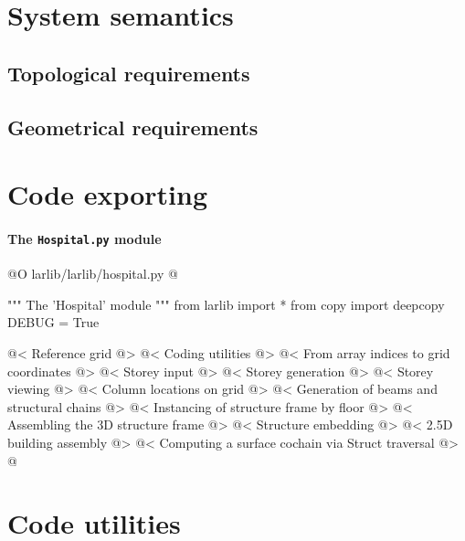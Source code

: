 \documentclass[11pt,oneside]{article}    %
\begin{document}
\section{System semantics}

\subsection{Topological requirements}

\subsection{Geometrical requirements}


\section{Code exporting}

\paragraph{The \texttt{Hospital.py} module}
@O larlib/larlib/hospital.py
@{""" The 'Hospital' module """
from larlib import *
from copy import deepcopy
DEBUG = True

@< Reference grid @>
@< Coding utilities @>
@< From array indices to grid coordinates @>
@< Storey input @>
@< Storey generation @>
@< Storey viewing @>
@< Column locations on grid @>
@< Generation of beams and structural chains @>
@< Instancing of structure frame by floor @>
@< Assembling the 3D structure frame @>
@< Structure embedding @>
@< 2.5D building assembly @>
@< Computing a surface cochain via Struct traversal @>
@}


\appendix
\section{Code utilities}
\end{document}
